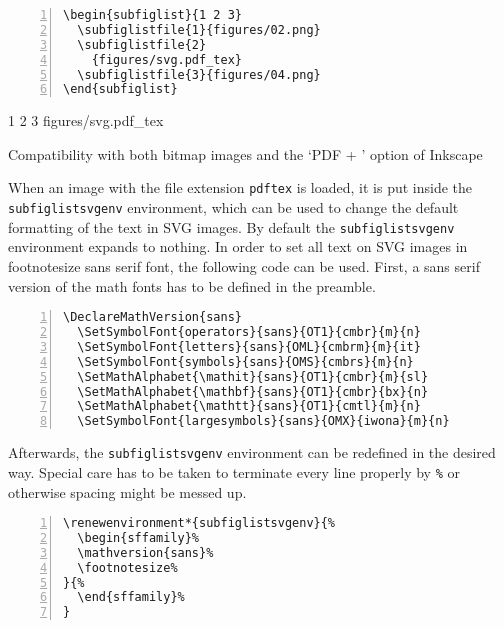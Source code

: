 \documentclass[version=3.12,american]{scrartcl}
\begin{document}
\begin{listing}
\begin{minipage}{0.4\textwidth}
\begin{Verbatim}[numbers=left]
\begin{subfiglist}{1 2 3}
  \subfiglistfile{1}{figures/02.png}
  \subfiglistfile{2}
    {figures/svg.pdf_tex}
  \subfiglistfile{3}{figures/04.png}
\end{subfiglist}
\end{Verbatim}
\end{minipage}
\hfill
\begin{minipage}{0.5\textwidth}
\begin{subfiglist}{1 2 3}
    {figures/svg.pdf_tex}
\end{subfiglist}
\end{minipage}
\caption{Compatibility with both bitmap images and the `PDF + ' option of Inkscape}
\label{lst:svg}
\end{listing}

When an image with the file extension \texttt{pdf\textunderscore tex} is loaded, it is put inside the \texttt{subfiglistsvgenv} environment, which can be used to change the default formatting of the text in SVG images. By default the \texttt{subfiglistsvgenv} environment expands to nothing. In order to set all text on SVG images in footnotesize sans serif font, the following code can be used. First, a sans serif version of the math fonts has to be defined in the preamble.

\begin{Verbatim}[numbers=left]
\DeclareMathVersion{sans}
  \SetSymbolFont{operators}{sans}{OT1}{cmbr}{m}{n}
  \SetSymbolFont{letters}{sans}{OML}{cmbrm}{m}{it}
  \SetSymbolFont{symbols}{sans}{OMS}{cmbrs}{m}{n}
  \SetMathAlphabet{\mathit}{sans}{OT1}{cmbr}{m}{sl}
  \SetMathAlphabet{\mathbf}{sans}{OT1}{cmbr}{bx}{n}
  \SetMathAlphabet{\mathtt}{sans}{OT1}{cmtl}{m}{n}
  \SetSymbolFont{largesymbols}{sans}{OMX}{iwona}{m}{n}
\end{Verbatim}

Afterwards, the \texttt{subfiglistsvgenv} environment can be redefined in the desired way. Special care has to be taken to terminate every line properly by \texttt{\%} or otherwise spacing might be messed up.

\begin{Verbatim}[numbers=left]
\renewenvironment*{subfiglistsvgenv}{%
  \begin{sffamily}%
  \mathversion{sans}%
  \footnotesize%
}{%
  \end{sffamily}%
}
\end{Verbatim}
%
\renewenvironment*{subfiglistsvgenv}{%
  \begin{sffamily}%
  \mathversion{sans}%
  \footnotesize%
}{%
  \end{sffamily}%
}
\end{document}
